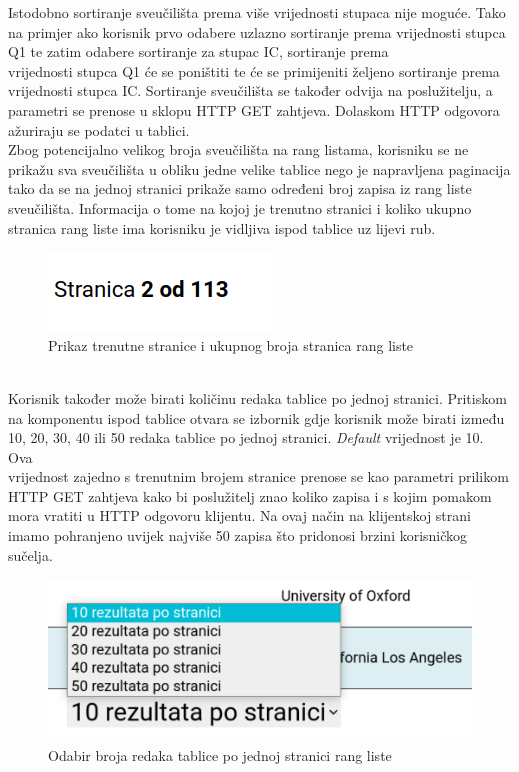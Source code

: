 \documentclass[times, utf8, zavrsni]{fer}
\begin{document}
Istodobno sortiranje sveučilišta prema više vrijednosti stupaca nije moguće. Tako na primjer ako korisnik prvo odabere uzlazno sortiranje prema vrijednosti stupca 
Q1 te zatim odabere sortiranje za stupac IC, sortiranje prema \\vrijednosti stupca Q1 će se poništiti te će se primijeniti željeno sortiranje prema \\vrijednosti stupca IC.
Sortiranje sveučilišta se također odvija na 
poslužitelju, a parametri se prenose u sklopu HTTP GET zahtjeva. Dolaskom HTTP odgovora ažuriraju se podatci u tablici.
\\Zbog potencijalno velikog broja sveučilišta na rang listama, korisniku se ne prikažu sva sveučilišta u obliku jedne velike tablice nego 
je napravljena paginacija tako da se na jednoj stranici prikaže samo određeni broj zapisa iz rang liste sveučilišta. Informacija o tome na kojoj je trenutno stranici i 
koliko ukupno stranica rang liste ima korisniku je vidljiva ispod tablice uz lijevi rub. 
\begin{figure}[htb]
    \centering
       \includegraphics[scale=0.3]{stranica.png} 
       \caption{Prikaz trenutne stranice i ukupnog broja stranica rang liste}
       \label{fig:paginacija}
       \end{figure}
\\Korisnik također može birati količinu redaka tablice po jednoj stranici. Pritiskom na komponentu ispod tablice otvara se 
izbornik gdje korisnik može birati između 10, 20, 30, 40 ili 50 redaka tablice po jednoj stranici. \emph{Default} vrijednost je 10. Ova \\vrijednost zajedno s 
trenutnim brojem stranice prenose se kao parametri prilikom HTTP GET zahtjeva kako bi poslužitelj znao koliko zapisa i s kojim pomakom mora vratiti u 
HTTP odgovoru klijentu. Na ovaj način na klijentskoj strani imamo pohranjeno uvijek najviše 50 zapisa što pridonosi brzini korisničkog sučelja.
\begin{figure}[htb]
    \centering
       \includegraphics[scale=0.3]{brojstranica.png} 
       \caption{Odabir broja redaka tablice po jednoj stranici rang liste}
       \label{fig:brojstranica}
       \end{figure}
\end{document}
